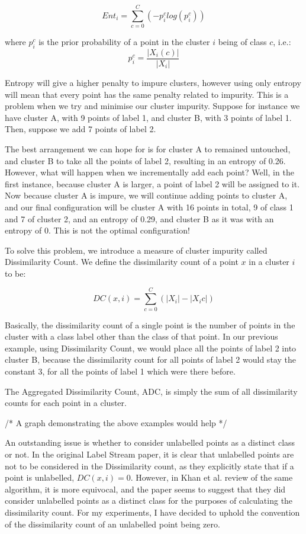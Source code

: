 \documentclass[12pt,a4paper,oneside]{report}
\begin{document}
\[Ent_i = \sum_{c=0}^C(-p_i^clog(p_i^c))\] 

where \(p_i^c\) is the prior probability of a point in the cluster \(i\) being of class \(c\), i.e.:
\[p_i^c = \frac{|X_i(c)|}{|X_i|}\] 

Entropy will give a higher penalty to impure clusters, however using only entropy will mean that every point has the same penalty related to impurity. This is a problem when we try and minimise our cluster impurity. Suppose for instance we have cluster A, with 9 points of label 1, and cluster B, with 3 points of label 1. Then, suppose we add 7 points of label 2. 

The best arrangement we can hope for is for cluster A to remained untouched, and cluster B to take all the points of label 2, resulting in an entropy of 0.26. However, what will happen when we incrementally add each point? Well, in the first instance, because cluster A is larger, a point of label 2 will be assigned to it. Now because cluster A is impure, we will continue adding points to cluster A, and our final configuration will be cluster A with 16 points in total, 9 of class 1 and  7 of cluster 2, and an entropy of 0.29, and cluster B as it was with an entropy of 0. This is not the optimal configuration!

To solve this problem, we introduce a measure of cluster impurity called Dissimilarity Count. We define the dissimilarity count of a point \(x\) in a cluster \(i\) to be:

\[DC(x,i) = \sum_{c=0}^C(|X_i| - |X_ic|)\] 

Basically, the dissimilarity count of a single point is the number of points in the cluster with a class label other than the class of that point. In our previous example, using Dissimilarity Count, we would place all the points of label 2 into cluster B, because the dissimilarity count for all points of label 2 would stay the constant 3, for all the points of label 1 which were there before. 

The Aggregated Dissimilarity Count, ADC, is simply the sum of all dissimilarity counts for each point in a cluster. 

/* A graph demonstrating the above examples would help */

An outstanding issue is whether to consider unlabelled points as a distinct class or not. In the original Label Stream paper, it is clear that unlabelled points are not to be considered in the Dissimilarity count, as they explicitly state that if a point is unlabelled, \(DC(x,i) = 0\).\cite{LabStr} However, in Khan et al. review of the same algorithm, it is more equivocal, and the paper seems to suggest that they did consider unlabelled points as a distinct class for the purposes of calculating the dissimilarity count. For my experiments, I have decided to uphold the convention of the dissimilarity count of an unlabelled point being zero.  
 
\end{document}
